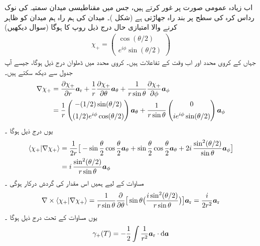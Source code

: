 اب  زیادہ عمومی صورت پر غور کرتے ہیں،  جس میں مقناطیسی میدان سمتیہ کی  نوک رداس   کرہ  کی  سطح پر    بند راہ جھاڑتی ہے  (شکل  )۔ میدان  کی ہم راہ  ہم میدان کو ظاہر کرنے والا امتیازی حال درج ذیل روپ کا ہوگا (سوال  دیکھیں)
\begin{align}
\chi_{+} = 
\begin{pmatrix}
\cos (\theta/2) \\[0.5em]
e^{i \phi} \sin (\theta /2)
\end{pmatrix}
\end{align}
جہاں  کے  کروی محدد  اور    اب وقت کے تفاعلات ہیں۔ کروی محدد میں ڈھلوان  درج ذیل ہوگا،  جیسے آپ جدول سے دیکھ سکتے ہیں۔ 
\begin{align}
\nabla \chi_{+} &= \frac{\partial \chi_{+}}{\partial r} {\boldsymbol{a}}_{\textup{r}} + \frac{1}{r} \frac{\partial \chi_{+}}{\partial \theta} {\boldsymbol{a}}_{\theta} + \frac{1}{r \sin \theta} \frac{\partial \chi_{+}}{\partial \phi} {\boldsymbol{a}}_{\phi} \nonumber\\
&= \frac{1}{r} 
\begin{pmatrix}
- (1/2) \sin (\theta/2) \\[0.5em]
(1/2) e^{i \phi} \cos (\theta /2)
\end{pmatrix}
{\boldsymbol{a}}_{\theta} + \frac{1}{r \sin \theta}
\begin{pmatrix}
0 \\[0.5em]
i e^{i \phi} \sin (\theta /2)
\end{pmatrix} 
{\boldsymbol{a}}_{\phi}
\end{align}
یوں درج ذیل ہوگا ۔
\begin{align}
\langle \chi_{+} | \nabla \chi_{+} \rangle &= \frac{1}{2r} \big [ - \sin \frac{\theta}{2} \cos \frac{\theta}{2} {\boldsymbol{a}}_{\theta} + \sin \frac{\theta}{2} \cos \frac{\theta}{2} {\boldsymbol{a}}_{\theta} + 2i \,\frac{\sin^2 (\theta/2)}{\sin \theta} {\boldsymbol{a}}_{\phi} \big ] \nonumber\\
&= i \,\frac{\sin^2 (\theta /2)}{r \sin \theta}{\boldsymbol{a}}_{\phi}
\end{align}
مساوات  کے لیے ہمیں اس  مقدار کی گردش درکار ہوگی ۔
\begin{align}
\nabla \times \langle \chi_{+} | \nabla \chi_{+} \rangle = \frac{1}{r \sin \theta} \frac{\partial}{\partial \theta} \big [ \sin \theta \big ( \frac{i \sin^2 (\theta /2)}{r \sin \theta} \big ) \big ] {\boldsymbol{a}}_{\textup{r}} = \frac{i}{2r^2} {\boldsymbol{a}}_{\textup{r}}
\end{align}
یوں مساوات  کے تحت درج ذیل ہوگا ۔
\begin{align}
\gamma_{+} (T) = - \frac{1}{2} \int \frac{1}{r^2} \ar \cdot \dif \kvec{a}
\end{align}
